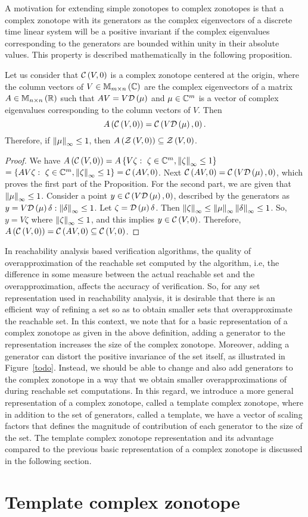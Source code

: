 A motivation for extending simple zonotopes to complex zonotopes is
that a complex zonotope with its generators as the complex
eigenvectors of a discrete time linear system will be a positive
invariant if the complex eigenvalues corresponding to the generators
are bounded within unity in their absolute values.  This property is
described mathematically in the following proposition.
%
\begin{proposition}
Let us consider that $\mathit{\mathcal{C}}\left(V,0\right)$ is a complex zonotope centered at
the origin, where the column vectors of $V\in\mathbb{M}_{m\times n}\left(\mathbb{C}\right)$
are the complex eigenvectors of a matrix $A\in\mathbb{M}_{n\times n}\left(\mathbb{R}\right)$ such
that $AV = V\mathcal{D}\left(\mu\right)$ and $\mu\in\mathbb{C}^m$ is a vector of
complex eigenvalues corresponding to the column vectors of $V$.
Then \[A\left(\mathit{\mathcal{C}}\left(V,0\right)\right) = \mathit{\mathcal{C}}\left(V\mathcal{D}\left(\mu\right),0\right).\]
Therefore, if $\left\|\mu\right\|_{\infty}\leq 1$, then
$A\left(\mathit{\mathcal{Z}}\left(V,0\right)\right)\subseteq \mathit{\mathcal{Z}}\left(V,0\right)$.
\end{proposition}
% 
\begin{proof}
We have $A\left(\mathit{\mathcal{C}}\left(V,0\right)\right) =
A\left\{V\zeta:~\zeta\in\mathbb{C}^m,\left\|\zeta\right\|_{\infty}\leq 1\right\}$\\
$=\left\{AV\zeta:~\zeta\in\mathbb{C}^m,\left\|\zeta\right\|_{\infty}\leq 1\right\}
= \mathit{\mathcal{C}}\left(AV,0\right)$.  Next $\mathit{\mathcal{C}}\left(AV,0\right)
= \mathit{\mathcal{C}}\left(V\mathcal{D}\left(\mu\right),0\right)$, which proves the first part of the
Proposition.  For the second part, we are given that
$\left\|\mu\right\|_{\infty}\leq 1$.  Consider a point $y\in \mathit{\mathcal{C}}\left(V\mathcal{D}\left(\mu\right),0\right)$,
described by the generators as
$y = V\mathcal{D}\left(\mu\right)\delta:\left\|\delta\right\|_{\infty}\leq 1$.
Let $\zeta = \mathcal{D}\left(\mu\right)\delta$. Then
$\left\|\zeta\right\|_{\infty} \leq \left\|\mu\right\|_{\infty}\left\|\delta\right\|_{\infty} \leq 1$.  So, 
$y=V\zeta$ where $\left\|\zeta\right\|_{\infty}\leq 1$, and this implies $y\in \mathit{\mathcal{C}}\left(V,0\right)$.
Therefore, $A\left(\mathit{\mathcal{C}}\left(V,0\right)\right)=\mathit{\mathcal{C}}\left(AV,0\right)\subseteq \mathit{\mathcal{C}}\left(V,0\right)$.
\end{proof}
%
In reachability analysis based verification algorithms, the quality of
overapproximation of the reachable set computed by the algorithm, i.e,
the difference in some measure between the actual reachable set and
the overapproximation, affects the accuracy of verification.  So, for
any set representation used in reachability analysis, it is desirable
that there is an efficient way of refining a set so as to obtain
smaller sets that overapproximate the reachable set.  In this context,
we note that for a basic representation of a complex zonotope as given
in the above definition, adding a generator to the representation
increases the size of the complex zonotope.  Moreover, adding a
generator can distort the positive invariance of the set itself, as
illustrated in Figure~\ref{todo}.  Instead, we should be able to
change and also add generators to the complex zonotope in a way that
we obtain smaller overapproximations of during reachable set
computations.  In this regard, we introduce a more general
representation of a complex zonotope, called a template complex
zonotope, where in addition to the set of generators, called a
template, we have a vector of scaling factors that defines the
magnitude of contribution of each generator to the size of the set.
The template complex zonotope representation and its advantage
compared to the previous basic representation of a complex zonotope is
discussed in the following section.
%
\section{Template complex zonotope}
